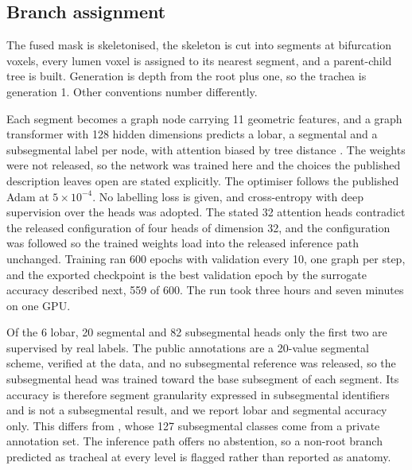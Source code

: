 \documentclass[runningheads]{llncs}
\begin{document}
\subsection{Branch assignment}
The fused mask is skeletonised, the skeleton is cut into segments at bifurcation
voxels, every lumen voxel is assigned to its nearest segment, and a
parent-child tree is built. Generation is depth from the root plus one, so the
trachea is generation 1. Other conventions number differently.

Each segment becomes a graph node carrying 11 geometric features, and a graph
transformer with 128 hidden dimensions predicts a lobar, a segmental and a
subsegmental label per node, with attention biased by tree distance
\cite{zhang2025airmorph}. The weights were not released, so the network was
trained here and the choices the published description leaves open are stated
explicitly. The optimiser follows the published Adam at $5\times10^{-4}$. No
labelling loss is given, and cross-entropy with deep supervision over the heads
was adopted. The stated 32 attention heads contradict the released configuration
of four heads of dimension 32, and the configuration was followed so the trained
weights load into the released inference path unchanged. Training ran 600 epochs
with validation every 10, one graph per step, and the exported checkpoint is the
best validation epoch by the surrogate accuracy described next, 559 of 600. The
run took three hours and seven minutes on one GPU.

Of the 6 lobar, 20 segmental and 82 subsegmental heads only the first two are
supervised by real labels. The public annotations are a 20-value segmental
scheme, verified at the data, and no subsegmental reference was released, so the
subsegmental head was trained toward the base subsegment of each segment. Its
accuracy is therefore segment granularity expressed in subsegmental identifiers
and is not a subsegmental result, and we report lobar and segmental accuracy
only. This differs from \cite{zhang2025airmorph}, whose 127 subsegmental classes
come from a private annotation set. The inference path offers no abstention, so
a non-root branch predicted as tracheal at every level is flagged rather than
reported as anatomy.
\end{document}
